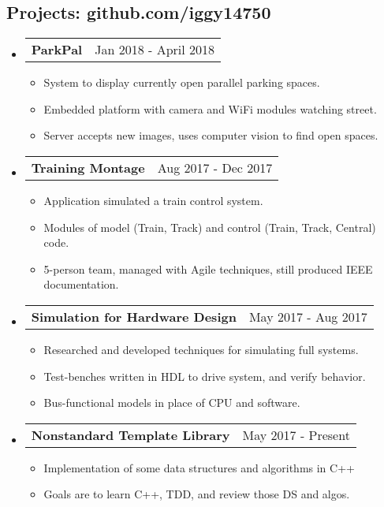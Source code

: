 \documentclass[18pt]{article}
\makeatletter
\providecommand{\tightlist}{
    \setlength{\itemsep}{0pt}\setlength{\parskip}{0pt}
}
\providecommand{\datetable}[2]{
    \begin{tabular*}{\textwidth}{@{}r @{\extracolsep{\fill}} l}
        #1 & #2
    \end{tabular*}
}
\makeatother
\begin{document}
    \subsection*{Projects: github.com/iggy14750}\label{projects}
    \begin{itemize}[label={}]\tightlist
        
        \item \datetable{\textbf{ParkPal}}
        {Jan 2018 - April 2018}
        \begin{itemize}\tightlist
            \item System to display currently open parallel parking spaces.
            \item Embedded platform with camera and WiFi modules watching street.
            \item Server accepts new images, uses computer vision to find open spaces.
        \end{itemize}

        \item \datetable{\textbf{Training Montage}}
        {Aug 2017 - Dec 2017}
        \begin{itemize}\tightlist
            \item Application simulated a train control system.
            \item Modules of model (Train, Track) and control (Train, Track, Central) code.
            \item 5-person team, managed with Agile techniques, still produced IEEE documentation.
        \end{itemize}

        \item \datetable{\textbf{Simulation for Hardware Design}}
        {May 2017 - Aug 2017}
        \begin{itemize}\tightlist
            \item Researched and developed techniques for simulating full systems.
            \item Test-benches written in HDL to drive system, and verify behavior.
            \item Bus-functional models in place of CPU and software.
        \end{itemize}
        
        \item \datetable{\textbf{Nonstandard Template Library}}
        {May 2017 - Present}
        \begin{itemize}\tightlist
            \item Implementation of some data structures and algorithms in C++
            \item Goals are to learn C++, TDD, and review those DS and algos.
        \end{itemize}
            

\end{itemize}
\end{document}

